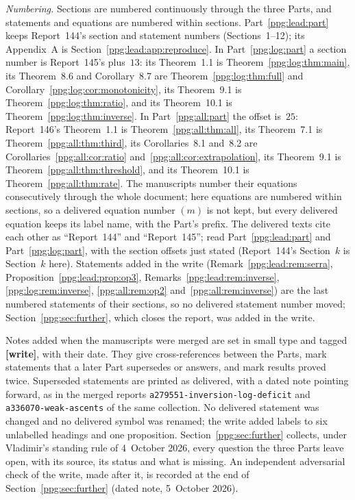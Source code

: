\documentclass[11pt,letterpaper]{article}
\theoremstyle{remark}\newtheorem{remark}[theorem]{Remark}
\numberwithin{equation}{section}
\newcommand{\file}[1]{\nolinkurl{#1}}
\begin{document}
\emph{Numbering.} Sections are numbered continuously through the three Parts, and statements and equations are numbered within sections. Part~\ref{ppg:lead:part} keeps Report~144's section and statement numbers (Sections~1--12); its Appendix~A is Section~\ref{ppg:lead:app:reproduce}. In Part~\ref{ppg:log:part} a section number is Report~145's plus~$13$: its Theorem~1.1 is Theorem~\ref{ppg:log:thm:main}, its Theorem~8.6 and Corollary~8.7 are Theorem~\ref{ppg:log:thm:full} and Corollary~\ref{ppg:log:cor:monotonicity}, its Theorem~9.1 is Theorem~\ref{ppg:log:thm:ratio}, and its Theorem~10.1 is Theorem~\ref{ppg:log:thm:inverse}. In Part~\ref{ppg:all:part} the offset is~$25$: Report~146's Theorem~1.1 is Theorem~\ref{ppg:all:thm:all}, its Theorem~7.1 is Theorem~\ref{ppg:all:thm:third}, its Corollaries~8.1 and~8.2 are Corollaries~\ref{ppg:all:cor:ratio} and~\ref{ppg:all:cor:extrapolation}, its Theorem~9.1 is Theorem~\ref{ppg:all:thm:threshold}, and its Theorem~10.1 is Theorem~\ref{ppg:all:thm:rate}. The manuscripts number their equations consecutively through the whole document; here equations are numbered within sections, so a delivered equation number $(m)$ is not kept, but every delivered equation keeps its label name, with the Part's prefix. The delivered texts cite each other as ``Report~144'' and ``Report~145''; read Part~\ref{ppg:lead:part} and Part~\ref{ppg:log:part}, with the section offsets just stated (Report~144's Section~$k$ is Section~$k$ here). Statements added in the write (Remark~\ref{ppg:lead:rem:serra}, Proposition~\ref{ppg:lead:prop:op3}, Remarks~\ref{ppg:lead:rem:inverse}, \ref{ppg:log:rem:inverse}, \ref{ppg:all:rem:op2} and~\ref{ppg:all:rem:inverse}) are the last numbered statements of their sections, so no delivered statement number moved; Section~\ref{ppg:sec:further}, which closes the report, was added in the write.

Notes added when the manuscripts were merged are set in small type and tagged \textbf{[write]}, with their date. They give cross-references between the Parts, mark statements that a later Part supersedes or answers, and mark results proved twice. Superseded statements are printed as delivered, with a dated note pointing forward, as in the merged reports \file{a279551-inversion-log-deficit} and \file{a336070-weak-ascents} of the same collection. No delivered statement was changed and no delivered symbol was renamed; the write added labels to six unlabelled headings and one proposition. Section~\ref{ppg:sec:further} collects, under Vladimir's standing rule of 4~October 2026, every question the three Parts leave open, with its source, its status and what is missing. An independent adversarial check of the write, made after it, is recorded at the end of Section~\ref{ppg:sec:further} (dated note, 5~October 2026).
\end{document}
